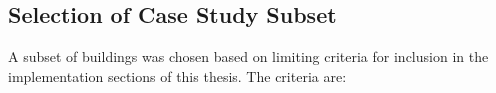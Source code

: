 \subsection{Selection of Case Study Subset}
\label{casestudysubset}

A subset of buildings was chosen based on limiting criteria for inclusion in the implementation sections of this thesis. The criteria are: